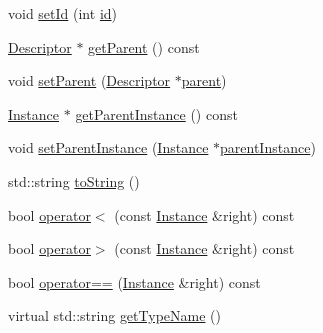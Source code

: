 \begin{DoxyCompactItemize}
void \mbox{\hyperlink{class_erable_1_1_erable_1_1_types_1_1_instance_aa9c7665ad10cff3e0f564b230ac5969b}{set\+Id}} (int \mbox{\hyperlink{class_erable_1_1_erable_1_1_types_1_1_instance_a4d587f5650cf567a76d00de2168b92bc}{id}})
\item 
\mbox{\hyperlink{class_erable_1_1_descriptor}{Descriptor}} $\ast$ \mbox{\hyperlink{class_erable_1_1_erable_1_1_types_1_1_instance_a225cfe147ebc8f88f4133533ad2a24ba}{get\+Parent}} () const
\item 
void \mbox{\hyperlink{class_erable_1_1_erable_1_1_types_1_1_instance_a08d508412ae0b8c59167880a8c076bf0}{set\+Parent}} (\mbox{\hyperlink{class_erable_1_1_descriptor}{Descriptor}} $\ast$\mbox{\hyperlink{class_erable_1_1_erable_1_1_types_1_1_instance_a6726e76e24e7aa2907eba203c9b93f04}{parent}})
\item 
\mbox{\hyperlink{class_erable_1_1_erable_1_1_types_1_1_instance}{Instance}} $\ast$ \mbox{\hyperlink{class_erable_1_1_erable_1_1_types_1_1_instance_a9abcc01355aef86126433ae6fb442ece}{get\+Parent\+Instance}} () const
\item 
void \mbox{\hyperlink{class_erable_1_1_erable_1_1_types_1_1_instance_a53be3c6fec645b3a9b699f7583a143da}{set\+Parent\+Instance}} (\mbox{\hyperlink{class_erable_1_1_erable_1_1_types_1_1_instance}{Instance}} $\ast$\mbox{\hyperlink{class_erable_1_1_erable_1_1_types_1_1_instance_a785d3c2a59f2f4981696d9728130573c}{parent\+Instance}})
\item 
std\+::string \mbox{\hyperlink{class_erable_1_1_erable_1_1_types_1_1_instance_ace96251a132dbb6262423095bcc035a1}{to\+String}} ()
\item 
bool \mbox{\hyperlink{class_erable_1_1_erable_1_1_types_1_1_instance_a18ec75b19ac649f7065af96c82261479}{operator$<$}} (const \mbox{\hyperlink{class_erable_1_1_erable_1_1_types_1_1_instance}{Instance}} \&right) const
\item 
bool \mbox{\hyperlink{class_erable_1_1_erable_1_1_types_1_1_instance_ac3df94fa055d67104e55417c4d79cc7c}{operator$>$}} (const \mbox{\hyperlink{class_erable_1_1_erable_1_1_types_1_1_instance}{Instance}} \&right) const
\item 
bool \mbox{\hyperlink{class_erable_1_1_erable_1_1_types_1_1_instance_a024adcae150c770efed5ab968267dd86}{operator==}} (\mbox{\hyperlink{class_erable_1_1_erable_1_1_types_1_1_instance}{Instance}} \&right) const
\item 
virtual std\+::string \mbox{\hyperlink{class_erable_1_1_erable_1_1_types_1_1_instance_a9564c44d5522e2000d3192e41d12dee7}{get\+Type\+Name}} ()
\item 

\end{DoxyCompactItemize}
